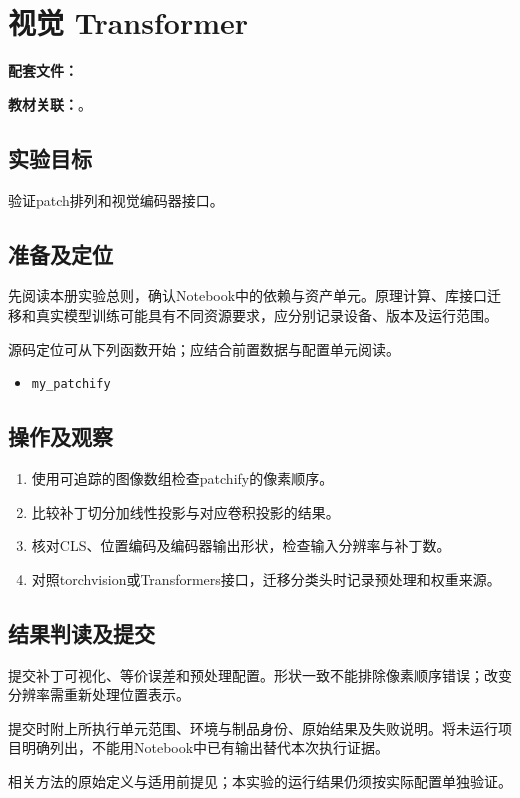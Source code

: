 \chapter{视觉 Transformer}
\label{lab:E40_cv_vit}

\noindent\textbf{配套文件：}\par
\noindent\textbf{教材关联：}。

\section*{实验目标}
验证patch排列和视觉编码器接口。

\section*{准备及定位}
先阅读本册实验总则，确认Notebook中的依赖与资产单元。原理计算、库接口迁移和真实模型训练可能具有不同资源要求，应分别记录设备、版本及运行范围。

源码定位可从下列函数开始；应结合前置数据与配置单元阅读。
\begin{itemize}
\item \texttt{my\_patchify}
\end{itemize}

\section*{操作及观察}
\begin{enumerate}
\item 使用可追踪的图像数组检查patchify的像素顺序。
\item 比较补丁切分加线性投影与对应卷积投影的结果。
\item 核对CLS、位置编码及编码器输出形状，检查输入分辨率与补丁数。
\item 对照torchvision或Transformers接口，迁移分类头时记录预处理和权重来源。
\end{enumerate}

\section*{结果判读及提交}
提交补丁可视化、等价误差和预处理配置。形状一致不能排除像素顺序错误；改变分辨率需重新处理位置表示。

提交时附上所执行单元范围、环境与制品身份、原始结果及失败说明。将未运行项目明确列出，不能用Notebook中已有输出替代本次执行证据。

相关方法的原始定义与适用前提见\cite{dosovitskiyImageWorth16x162022}；本实验的运行结果仍须按实际配置单独验证。
